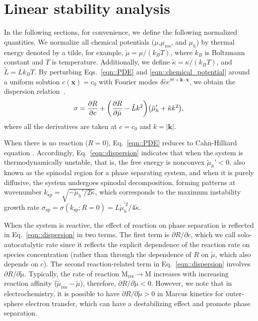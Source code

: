 \documentclass[reprint,aps,pre,superscriptaddress]{revtex4-2}
\newcommand{\pderiv}[2]{\frac{\partial {#1}}{\partial {#2}}}
\let\originalleft\left
\let\originalright\right
\renewcommand{\left}{\mathopen{}\mathclose\bgroup\originalleft}
\renewcommand{\right}{\aftergroup\egroup\originalright}
\begin{document}
\section{Linear stability analysis}
\label{sec::linear_stability}
In the following sections, for convenience, we define the following normalized quantities. We normalize all chemical potentials ($\mu$,$\mu_\text{res}$, and $\mu_h$) by thermal energy denoted by a tilde, for example,  $\tilde{\mu} = \mu/(k_B T)$, where $k_B$ is Boltzmann constant and $T$ is temperature. Additionally, we define $\tilde{\kappa}=\kappa / (k_B T)$, and $\tilde{L} = L k_B T$.
By perturbing Eqs.~\ref{eqn::PDE} and \ref{eqn::chemical_potential} around a uniform solution $c(\mathbf{x})=c_0$ with Fourier modes $\delta \hat{c} e^{\sigma t + \mathbf{k}\cdot \mathbf{x}}$, we obtain the dispersion relation~\cite{Bazant2017}.
\begin{equation} \label{eqn::dispersion}
  \sigma = \pderiv{R}{c} + \left( \pderiv{R}{\tilde{\mu}} - \tilde{L} k^2 \right) \left( \tilde{\mu}_h' + \tilde{\kappa} k^2 \right),
\end{equation}
where all the derivatives are taken at $c=c_0$ and $k=|\mathbf{k}|$.

When there is no reaction ($R=0$), Eq.~\ref{eqn::PDE} reduces to Cahn-Hilliard equation \cite{CahnJohnE.1958}. Accordingly, Eq.~\ref{eqn::dispersion} indicates that when the system is thermodynamically unstable, that is, the free energy is nonconvex $\tilde{\mu}_h'<0$, also known as the spinodal region for a phase separating system, and when it is purely diffusive, the system undergoes spinodal decomposition, forming patterns at wavenumber $k_\text{sp} = \sqrt{-\tilde{\mu}_h' / 2\tilde{\kappa}}$, which corresponds to the maximum instability growth rate $\sigma_\text{sp} = \sigma(k_\text{sp};R=0) = L\tilde{\mu}_h^{\prime2}/4\tilde{\kappa}$.

When the system is reactive, the effect of reaction on phase separation is reflected in Eq.~\ref{eqn::dispersion} in two terms. The first term is $\partial R / \partial c$, which we call solo-autocatalytic rate\cite{Bazant2017} since it reflects the explicit dependence of the reaction rate on species concentration (rather than through the dependence of $R$ on $\tilde{\mu}$, which also depends on $c$). The second reaction-related term in Eq.~\ref{eqn::dispersion} involves $\partial R / \partial \tilde{\mu}$. Typically, the rate of reaction $\text{M}_\text{res}\to \text{M}$ increases with increasing reaction affinity ($\tilde{\mu}_\text{res}-\tilde{\mu}$), therefore, $\partial R/\partial \tilde{\mu}<0$.
However, we note that in electrochemistry, it is possible to have $\partial R/\partial \tilde{\mu}>0$ in Marcus kinetics for outer-sphere electron transfer\cite{Marcus1993}, which can have a destabilizing effect and promote phase separation\cite{Bazant2013}. 
\end{document}
